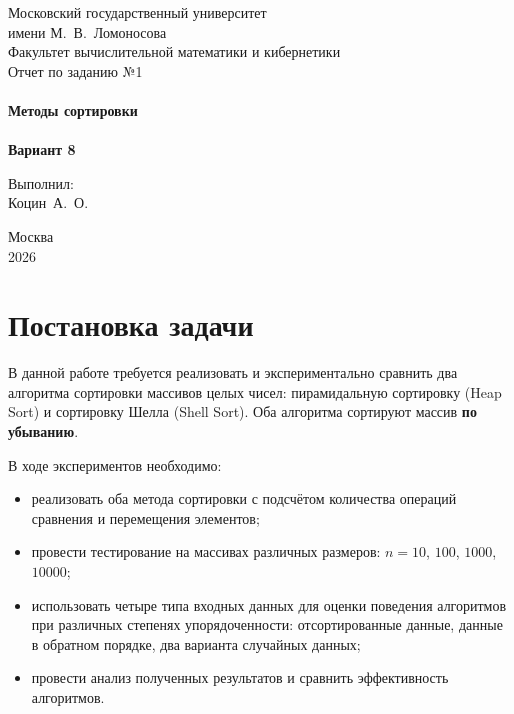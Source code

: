 \documentclass[a4paper,12pt,titlepage]{article}
\begin{document}
\begin{titlepage}
    \begin{center}
	{\small \sc Московский государственный университет \\имени М.~В.~Ломоносова\\
	Факультет вычислительной математики и кибернетики\\}
	\vfill
	{\Large \sc Отчет по заданию №1}\\
	~\\
	{\large \bf \guillemotleft{}Методы сортировки\guillemotright{}}\\ 
	~\\
	{\large \bf Вариант 8}
    \end{center}
    \begin{flushright}
	\vfill {Выполнил:\\
	Коцин~А.~О.}
    \end{flushright}
    \begin{center}
	\vfill
	{\small Москва\\2026}
    \end{center}
\end{titlepage}

\tableofcontents
\newpage

\section{Постановка задачи}

В данной работе требуется реализовать и экспериментально сравнить два алгоритма сортировки массивов целых чисел: пирамидальную сортировку (Heap Sort) и сортировку Шелла (Shell Sort). Оба алгоритма сортируют массив \textbf{по убыванию}.

В ходе экспериментов необходимо:

\begin{itemize}
\item реализовать оба метода сортировки с подсчётом количества операций сравнения и перемещения элементов;
\item провести тестирование на массивах различных размеров: $n = 10$, $100$, $1000$, $10000$;
\item использовать четыре типа входных данных для оценки поведения алгоритмов при различных степенях упорядоченности: отсортированные данные, данные в обратном порядке, два варианта случайных данных;
\item провести анализ полученных результатов и сравнить эффективность алгоритмов.
\end{itemize}
\end{document}
